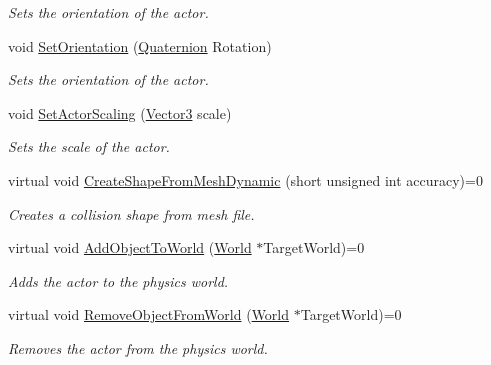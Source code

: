\begin{DoxyCompactItemize}
\begin{DoxyCompactList}\small\item\em Sets the orientation of the actor. \item\end{DoxyCompactList}\item 
void \hyperlink{classphys_1_1ActorBase_ac4b0bf1eff730d94f72d04957efea69d}{SetOrientation} (\hyperlink{classphys_1_1Quaternion}{Quaternion} Rotation)
\begin{DoxyCompactList}\small\item\em Sets the orientation of the actor. \item\end{DoxyCompactList}\item 
void \hyperlink{classphys_1_1ActorBase_a1ac7c692d7f88f39ebb1c1db5deba251}{SetActorScaling} (\hyperlink{classphys_1_1Vector3}{Vector3} scale)
\begin{DoxyCompactList}\small\item\em Sets the scale of the actor. \item\end{DoxyCompactList}\item 
virtual void \hyperlink{classphys_1_1ActorBase_aa41370f6d2031a9dad8df45bd7f3bcc6}{CreateShapeFromMeshDynamic} (short unsigned int accuracy)=0
\begin{DoxyCompactList}\small\item\em Creates a collision shape from mesh file. \item\end{DoxyCompactList}\item 
virtual void \hyperlink{classphys_1_1ActorBase_a3d28e4c4a33f50210101695cb33ded3b}{AddObjectToWorld} (\hyperlink{classphys_1_1World}{World} $\ast$TargetWorld)=0
\begin{DoxyCompactList}\small\item\em Adds the actor to the physics world. \item\end{DoxyCompactList}\item 
virtual void \hyperlink{classphys_1_1ActorBase_aaa787de7ec5d7d1d8428ea78f37bcb40}{RemoveObjectFromWorld} (\hyperlink{classphys_1_1World}{World} $\ast$TargetWorld)=0
\begin{DoxyCompactList}\small\item\em Removes the actor from the physics world. \item\end{DoxyCompactList}\item 

\end{DoxyCompactItemize}
